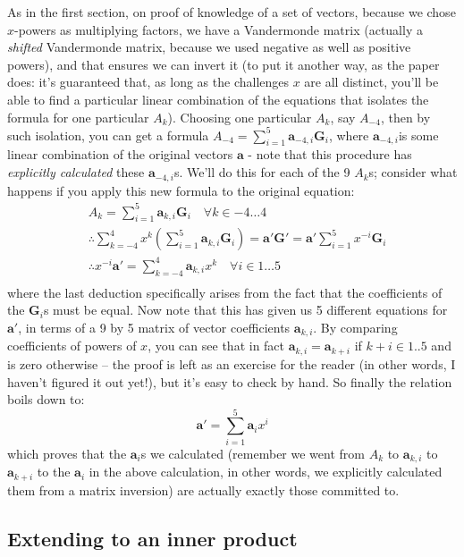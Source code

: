 \documentclass[10pt,a4paper]{article}
\begin{document}
As in the first section, on proof of knowledge of a set of vectors,
because we chose $x$-powers as multiplying factors, we have a Vandermonde
matrix (actually a \emph{shifted} Vandermonde matrix, because we used
negative as well as positive powers), and that ensures we can invert it
(to put it another way, as the paper does: it's guaranteed that, as long
as the challenges $x$ are all distinct, you'll be able to find a particular
linear combination of the equations that isolates the formula for one
particular $A_k$). Choosing one particular $A_k$, say $A_{-4}$, then by such isolation,
you can get a formula $A_{-4} = \sum\limits_{i=1}^{5} \textbf{a}_{-4, i} \textbf{G}_{i}$, where $\mathbf{a}_{-4, i}$is some linear combination of the original
vectors $\mathbf{a}$ - note that this procedure has \emph{explicitly calculated}
these $\mathbf{a}_{-4, i}$s. We'll do this for each of the 9 $A_k$s; consider what happens if you
apply this new formula to the original equation:
\begin{align*}
& A_k = \sum\limits_{i=1}^{5} \textbf{a}_{k,i}\textbf{G}_i \quad \forall k \in -4\ldots 4 \\
& \therefore \sum\limits_{k=-4}^{4} x^k \left(\sum\limits_{i=1}^{5} \textbf{a}_{k,i}\textbf{G}_i\right) = \textbf{a}'\textbf{G}' = \textbf{a}'\sum\limits_{i=1}^{5}x^{-i}\textbf{G}_i \\
& \therefore x^{-i}\textbf{a}' = \sum\limits_{k=-4}^{4} \textbf{a}_{k,i}x^k \quad \forall i \in 1\ldots 5 \\
\end{align*}
where the last deduction specifically arises from the fact that the
coefficients of the $\mathbf{G}_i$s must be equal. Now note that this has given us 5
different equations for $\mathbf{a}'$, in terms of a 9 by 5 matrix of vector
coefficients $\mathbf{a}_{k,i}$. By comparing coefficients of powers of $x$, you can see that
in fact $\textbf{a}_{k,i} = \textbf{a}_{k+i}$ if $k+i \in {1..5}$ and is zero otherwise -- the proof is left as an exercise for
the reader (in other words, I haven't figured it out yet!), but it's
easy to check by hand. So finally the relation boils down to:
\[\textbf{a}' = \sum\limits_{i=1}^5 \textbf{a}_i x^i\]
which proves that the $\mathbf{a}_i$s we calculated (remember we went from $A_k$ to $\mathbf{a}_{k,i}$ to $\mathbf{a}_{k+i}$ to
the $\mathbf{a}_i$ in the above calculation, in other words, we explicitly calculated
them from a matrix inversion) are actually exactly those committed to.

\hypertarget{extending-to-an-inner-product}{%
\subsection[Extending to an inner
product]{\texorpdfstring{\protect\hypertarget{anchor-46}{}{}Extending to
an inner
product}{Extending to an inner product}}\label{extending-to-an-inner-product}}
\end{document}
